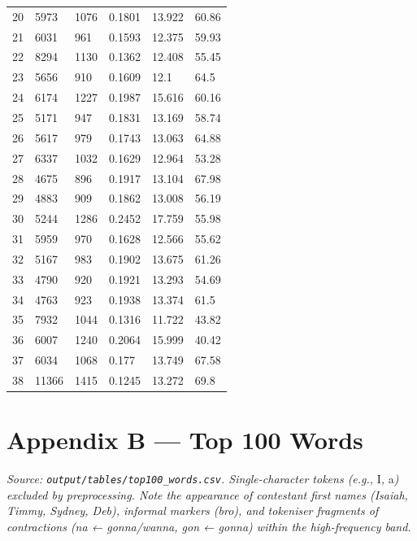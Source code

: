 \documentclass[11pt]{article}
\begin{document}
\begin{longtable}{llllll}
20 & 5973 & 1076 & 0.1801 & 13.922 & 60.86 \\
21 & 6031 & 961 & 0.1593 & 12.375 & 59.93 \\
22 & 8294 & 1130 & 0.1362 & 12.408 & 55.45 \\
23 & 5656 & 910 & 0.1609 & 12.1 & 64.5 \\
24 & 6174 & 1227 & 0.1987 & 15.616 & 60.16 \\
25 & 5171 & 947 & 0.1831 & 13.169 & 58.74 \\
26 & 5617 & 979 & 0.1743 & 13.063 & 64.88 \\
27 & 6337 & 1032 & 0.1629 & 12.964 & 53.28 \\
28 & 4675 & 896 & 0.1917 & 13.104 & 67.98 \\
29 & 4883 & 909 & 0.1862 & 13.008 & 56.19 \\
30 & 5244 & 1286 & 0.2452 & 17.759 & 55.98 \\
31 & 5959 & 970 & 0.1628 & 12.566 & 55.62 \\
32 & 5167 & 983 & 0.1902 & 13.675 & 61.26 \\
33 & 4790 & 920 & 0.1921 & 13.293 & 54.69 \\
34 & 4763 & 923 & 0.1938 & 13.374 & 61.5 \\
35 & 7932 & 1044 & 0.1316 & 11.722 & 43.82 \\
36 & 6007 & 1240 & 0.2064 & 15.999 & 40.42 \\
37 & 6034 & 1068 & 0.177 & 13.749 & 67.58 \\
38 & 11366 & 1415 & 0.1245 & 13.272 & 69.8 \\
\end{longtable}
\normalsize\setlength{\tabcolsep}{6pt}

\section*{Appendix B --- Top 100 Words}

\emph{Source: \texttt{output/tables/top100\_words.csv}. Single-character tokens (e.g., }I\emph{, }a\emph{) excluded by preprocessing. Note the appearance of contestant first names (Isaiah, Timmy, Sydney, Deb), informal markers (bro), and tokeniser fragments of contractions (na ← gonna/wanna, gon ← gonna) within the high-frequency band.}

\small\setlength{\tabcolsep}{4pt}
\end{document}
